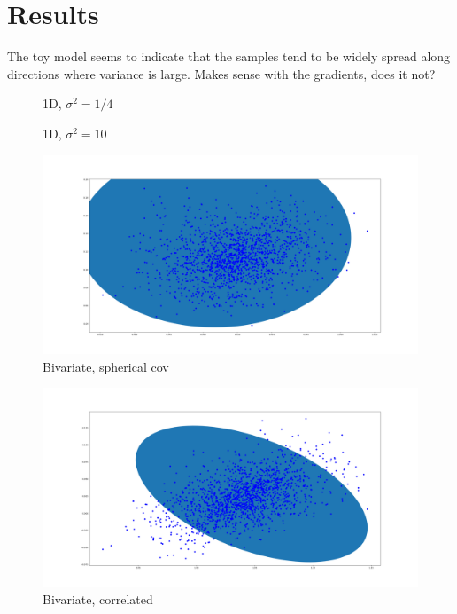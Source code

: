 \section{Results}

The toy model seems to indicate that the samples tend to be widely spread along directions where variance is large.
Makes sense with the gradients, does it not?

\begin{figure}
  
  \caption{1D, $\sigma^2 = 1/4$}\label{fig:1d_low_var}
\end{figure}

\begin{figure}
  
  \caption{1D, $\sigma^2 = 10$}\label{fig:1d_high_var}
\end{figure}

\begin{figure}
  \includegraphics[width=\linewidth]{fig/spherical_cov.png}
  \caption{Bivariate, spherical cov}\label{fig:spherical_cov}
\end{figure}


\begin{figure}
  \includegraphics[width=\linewidth]{fig/mirrored_cov_1.png}
  \caption{Bivariate, correlated}\label{fig:mirrored_cov_1}
\end{figure}
